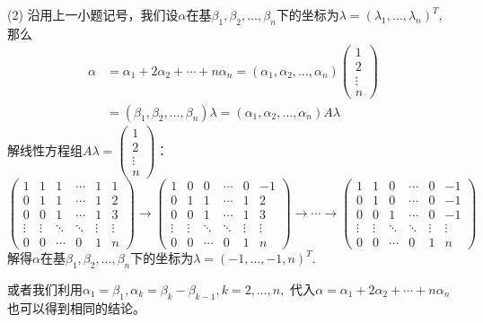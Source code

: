 (2) 沿用上一小题记号，我们设$\alpha$在基$\beta_1, \beta_2, \ldots, \beta_n$下的坐标为$\lambda = (\lambda_1, \ldots, \lambda_n)^T,$ 那么
\begin{align*}
\alpha & = \alpha_1 + 2 \alpha_2 + \cdots + n \alpha_n = (\alpha_1, \alpha_2, \ldots, \alpha_n) \begin{pmatrix} 1 \\ 2 \\ \vdots \\ n \end{pmatrix} \\
& = (\beta_1, \beta_2, \ldots, \beta_n) \lambda = (\alpha_1, \alpha_2, \ldots, \alpha_n) A \lambda
\end{align*}
解线性方程组$A \lambda = \begin{pmatrix} 1 \\ 2 \\ \vdots \\ n \end{pmatrix}$：
$$\left( \begin{array}{ccccc|c}1 & 1 & 1 & \cdots & 1 & 1 \\ 0 & 1 & 1 & \cdots & 1 & 2 \\ 0 & 0 & 1 & \cdots & 1 & 3 \\ \vdots & \vdots & \ddots & \ddots & \vdots & \vdots \\ 0 & 0 & \cdots & 0 & 1 & n \end{array} \right) \rightarrow \left( \begin{array}{ccccc|c}1 & 0 & 0 & \cdots & 0 & -1 \\ 0 & 1 & 1 & \cdots & 1 & 2 \\ 0 & 0 & 1 & \cdots & 1 & 3 \\ \vdots & \vdots & \ddots & \ddots & \vdots & \vdots \\ 0 & 0 & \cdots & 0 & 1 & n \end{array} \right) \rightarrow \cdots \rightarrow \left( \begin{array}{ccccc|c}1 & 1 & 0 & \cdots & 0 & -1 \\ 0 & 1 & 0 & \cdots & 0 & -1 \\ 0 & 0 & 1 & \cdots & 0 & -1 \\ \vdots & \vdots & \ddots & \ddots & \vdots & \vdots \\ 0 & 0 & \cdots & 0 & 1 & n \end{array} \right)$$
解得$\alpha$在基$\beta_1, \beta_2, \ldots, \beta_n$下的坐标为$\lambda = (-1, \ldots, -1, n)^T.$

或者我们利用$\alpha_1 = \beta_1, \alpha_k = \beta_k - \beta_{k-1}, k = 2, \ldots, n,$ 代入$\alpha = \alpha_1 + 2 \alpha_2 + \cdots + n \alpha_n$也可以得到相同的结论。

